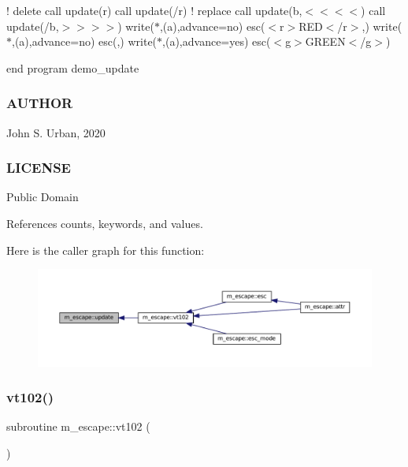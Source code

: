 ! delete call update(\textquotesingle{}r\textquotesingle{}) call update(\textquotesingle{}/r\textquotesingle{}) ! replace call update(\textquotesingle{}b\textquotesingle{},\textquotesingle{}$<$$<$$<$$<$\textquotesingle{}) call update(\textquotesingle{}/b\textquotesingle{},\textquotesingle{}$>$$>$$>$$>$\textquotesingle{}) write($\ast$,\textquotesingle{}(a)\textquotesingle{},advance=\textquotesingle{}no\textquotesingle{}) esc(\textquotesingle{}$<$r$>$R\+ED$<$/r$>$,\textquotesingle{}) write($\ast$,\textquotesingle{}(a)\textquotesingle{},advance=\textquotesingle{}no\textquotesingle{}) esc(,\textquotesingle{}) write($\ast$,\textquotesingle{}(a)\textquotesingle{},advance=\textquotesingle{}yes\textquotesingle{}) esc(\textquotesingle{}$<$g$>$G\+R\+E\+EN$<$/g$>$\textquotesingle{})

end program demo\+\_\+update

\subsubsection*{A\+U\+T\+H\+OR}

John S. Urban, 2020 \subsubsection*{L\+I\+C\+E\+N\+SE}

Public Domain 

References counts, keywords, and values.

Here is the caller graph for this function\+:\nopagebreak
\begin{figure}[H]
\begin{center}
\leavevmode
\includegraphics[width=350pt]{namespacem__escape_a5efd612f60d281003917329484a7960c_icgraph}
\end{center}
\end{figure}
\mbox{\label{namespacem__escape_ae9d40717b2e75e90e2505d5fed6435c5}} 
\subsubsection{\texorpdfstring{vt102()}{vt102()}}
{\footnotesize\ttfamily subroutine m\+\_\+escape\+::vt102 (\begin{DoxyParamCaption}{ }\end{DoxyParamCaption})\hspace{0.3cm}{\ttfamily [private]}}




